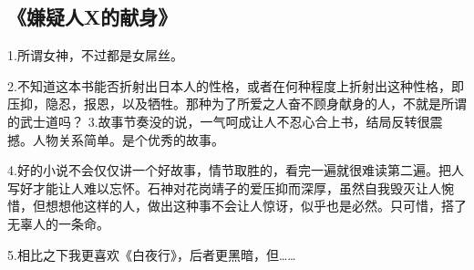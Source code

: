 \subsection{《嫌疑人X的献身》}
1.所谓女神，不过都是女屌丝。

2.不知道这本书能否折射出日本人的性格，或者在何种程度上折射出这种性格，即压抑，隐忍，报恩，以及牺牲。那种为了所爱之人奋不顾身献身的人，不就是所谓的武士道吗？
3.故事节奏没的说，一气呵成让人不忍心合上书，结局反转很震撼。人物关系简单。是个优秀的故事。

4.好的小说不会仅仅讲一个好故事，情节取胜的，看完一遍就很难读第二遍。把人写好才能让人难以忘怀。石神对花岗靖子的爱压抑而深厚，虽然自我毁灭让人惋惜，但想想他这样的人，做出这种事不会让人惊讶，似乎也是必然。只可惜，搭了无辜人的一条命。

5.相比之下我更喜欢《白夜行》，后者更黑暗，但……